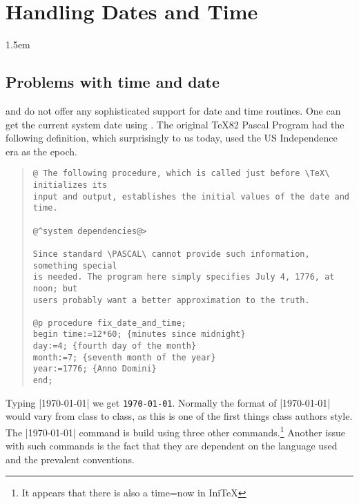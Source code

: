 
\makeatletter\@specialtrue\makeatother
{}
\chapter{Handling Dates and Time}
\label{dates}\label{ch:dates}

\parindent1.5em

\section{Problems with time and date}

\tex and \latex do not offer\cite{Thanh:TB18-4-249} any sophisticated support for date and time routines.
One can get the current system date using \cmd{\today}. The original TeX82 Pascal Program had the following definition, which surprisingly to us today, used the US Independence era as the epoch.

\begin{quotation}
\begin{verbatim}
@ The following procedure, which is called just before \TeX\ initializes its
input and output, establishes the initial values of the date and time.

@^system dependencies@>

Since standard \PASCAL\ cannot provide such information, something special
is needed. The program here simply specifies July 4, 1776, at noon; but
users probably want a better approximation to the truth.

@p procedure fix_date_and_time;
begin time:=12*60; {minutes since midnight}
day:=4; {fourth day of the month}
month:=7; {seventh month of the year}
year:=1776; {Anno Domini}
end;
\end{verbatim}
\end{quotation}


Typing |\today| we get \texttt{\today}. Normally the format of |\today| would vary from class to class, as this is one of the first things class authors style. The |\today| command is build using three other commands.\footnote{It appears that there is also a time=now in IniTeX} Another issue with such commands is the fact that they are dependent on the language used and the prevalent conventions.

